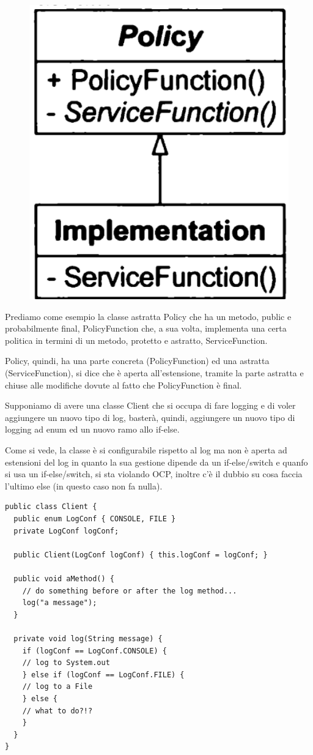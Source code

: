 \begin{figure}
  \includegraphics[width=0.5\linewidth]{../immagini/principio_SOLID/esempioOCP}  
\end{figure}

Prediamo come esempio la classe astratta Policy che ha un metodo, public e probabilmente final, PolicyFunction che, a sua volta, implementa una certa politica in termini di un metodo, protetto e 
astratto, ServiceFunction.

Policy, quindi, ha una parte concreta (PolicyFunction) ed una astratta (ServiceFunction), si dice che è aperta all'estensione, tramite la parte astratta e chiuse alle modifiche dovute al fatto 
che PolicyFunction è final.

Supponiamo di avere una classe Client che si occupa di fare logging e di voler aggiungere un nuovo tipo di log, basterà, quindi, aggiungere un nuovo tipo di logging ad enum ed un nuovo ramo allo if-else.

Come si vede, la classe è si configurabile rispetto al log ma non è aperta ad estensioni del log in quanto la sua gestione dipende da un if-else/switch e quanfo si usa un if-else/switch, si sta violando 
OCP, inoltre c'è il dubbio su cosa faccia l'ultimo else (in questo caso non fa nulla).

\begin{lstlisting}[linewidth=10cm]
public class Client {
  public enum LogConf { CONSOLE, FILE }
  private LogConf logConf;
  
  public Client(LogConf logConf) { this.logConf = logConf; }
  
  public void aMethod() {
    // do something before or after the log method...
    log("a message");
  }

  private void log(String message) {
    if (logConf == LogConf.CONSOLE) {
    // log to System.out
    } else if (logConf == LogConf.FILE) {
    // log to a File
    } else {
    // what to do?!?
    }
  }
}
\end{lstlisting}

